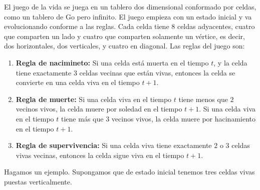 El juego de la vida se juega en un tablero dos dimensional conformado por celdas, como un tablero de Go pero infinito. El juego empieza con un estado inicial y va evolucionando conforme a las reglas. Cada celda tiene 8 celdas adyacentes, cuatro que comparten un lado y cuatro que comparten solamente un v\'ertice, es decir, dos horizontales, dos verticales, y cuatro en diagonal. Las reglas del juego son:

\begin{enumerate}
    \item \textbf{Regla de nacimineto:} Si una celda est\'a muerta en el tiempo $t$, y la celda tiene exactamente $3$ celdas vecinas que est\'an vivas, entonces la celda se convierte en una celda viva en el tiempo $t+1$.
    \item \textbf{Regla de muerte:} Si una celda viva en el tiempo $t$ tiene menos que $2$ vecinos vivos, la celda muere por soledad en el tiempo $t+1$. Si una celda viva en el tiempo $t$ tiene m\'as que $3$ vecinos vivos, la celda muere por hacinamiento en el tiempo $t+1$.
    \item \textbf{Regla de supervivencia:} Si una celda viva tiene exactamente $2$ o $3$ celdas vivas vecinas, entonces la celda sigue viva en el tiempo $t+1$.
\end{enumerate}

Hagamos un ejemplo. Supongamos que de estado inicial tenemos tres celdas vivas puestas verticalmente. 
